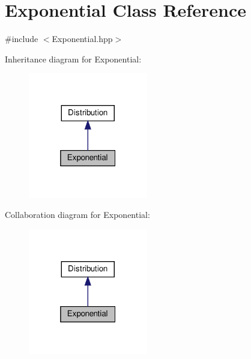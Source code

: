 \hypertarget{classExponential}{}\section{Exponential Class Reference}
\label{classExponential}


{\ttfamily \#include $<$Exponential.\+hpp$>$}



Inheritance diagram for Exponential\+:
\nopagebreak
\begin{figure}[H]
\begin{center}
\leavevmode
\includegraphics[width=148pt]{classExponential__inherit__graph}
\end{center}
\end{figure}


Collaboration diagram for Exponential\+:
\nopagebreak
\begin{figure}[H]
\begin{center}
\leavevmode
\includegraphics[width=148pt]{classExponential__coll__graph}
\end{center}
\end{figure}
